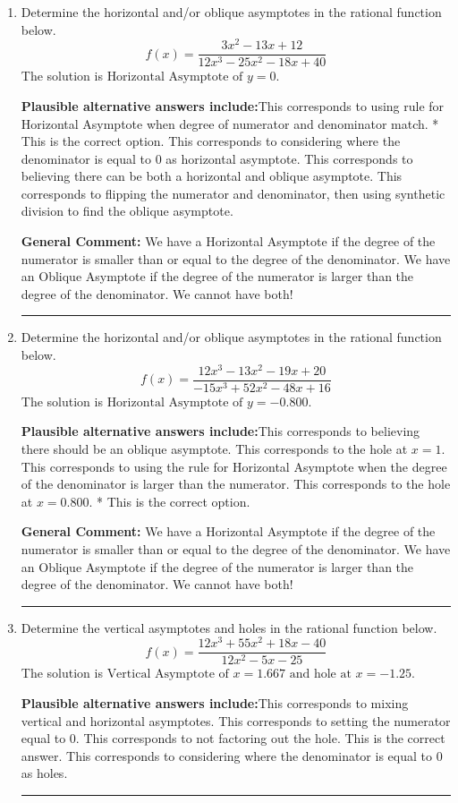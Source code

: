 \documentclass{extbook}[14pt]
\newcommand{\litem}[1]{\item #1

\rule{\textwidth}{0.4pt}}
\begin{document}
\begin{enumerate}\litem{
Determine the horizontal and/or oblique asymptotes in the rational function below.
\[ f(x) = \frac{3x^{2} -13 x + 12}{12x^{3} -25 x^{2} -18 x + 40} \]The solution is \( \text{Horizontal Asymptote of } y = 0 \).\begin{enumerate}[label=\Alph*.]
\textbf{Plausible alternative answers include:}This corresponds to using rule for Horizontal Asymptote when degree of numerator and denominator match.
* This is the correct option.
This corresponds to considering where the denominator is equal to 0 as horizontal asymptote.
This corresponds to believing there can be both a horizontal and oblique asymptote.
This corresponds to flipping the numerator and denominator, then using synthetic division to find the oblique asymptote.
\end{enumerate}

\textbf{General Comment:} We have a Horizontal Asymptote if the degree of the numerator is smaller than or equal to the degree of the denominator. We have an Oblique Asymptote if the degree of the numerator is larger than the degree of the denominator. We cannot have both!
}
\litem{
Determine the horizontal and/or oblique asymptotes in the rational function below.
\[ f(x) = \frac{12x^{3} -13 x^{2} -19 x + 20}{-15x^{3} +52 x^{2} -48 x + 16} \]The solution is \( \text{Horizontal Asymptote of } y = -0.800  \).\begin{enumerate}[label=\Alph*.]
\textbf{Plausible alternative answers include:}This corresponds to believing there should be an oblique asymptote.
This corresponds to the hole at $x = 1$.
This corresponds to using the rule for Horizontal Asymptote when the degree of the denominator is larger than the numerator.
This corresponds to the hole at $x = 0.800$.
* This is the correct option.
\end{enumerate}

\textbf{General Comment:} We have a Horizontal Asymptote if the degree of the numerator is smaller than or equal to the degree of the denominator. We have an Oblique Asymptote if the degree of the numerator is larger than the degree of the denominator. We cannot have both!
}
\litem{
Determine the vertical asymptotes and holes in the rational function below.
\[ f(x) = \frac{12x^{3} +55 x^{2} +18 x -40}{12x^{2} -5 x -25} \]The solution is \( \text{Vertical Asymptote of } x = 1.667 \text{ and hole at } x = -1.25 \).\begin{enumerate}[label=\Alph*.]
\textbf{Plausible alternative answers include:}This corresponds to mixing vertical and horizontal asymptotes.
This corresponds to setting the numerator equal to 0.
This corresponds to not factoring out the hole.
This is the correct answer.
This corresponds to considering where the denominator is equal to 0 as holes.
\end{enumerate}

}
\end{enumerate}
\end{document}
